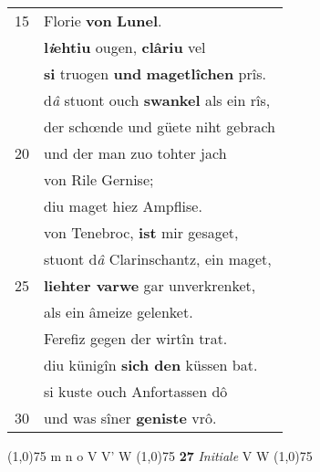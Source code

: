 \documentclass[8pt,a4paper,notitlepage]{article}
\begin{document}
\begin{table}[ht]
\begin{minipage}[t]{0.5\linewidth}
\begin{tabular}{rl}
15 & Florie \textbf{von} \textbf{Lunel}.\\ 
 & \textbf{l\textit{i}ehtiu} ougen, \textbf{clâriu} vel\\ 
 & \textbf{si} truogen \textbf{und} \textbf{magetlîchen} prîs.\\ 
 & d\textit{â} stuont ouch \textbf{swankel} als ein rîs,\\ 
 & der schœnde und güete niht gebrach\\ 
20 & und der man zuo tohter jach\\ 
 & von Rile Gernise;\\ 
 & diu maget hiez Ampflise.\\ 
 & von Tenebroc, \textbf{ist} mir gesaget,\\ 
 & stuont d\textit{â} Clarinschantz, ein maget,\\ 
25 & \textbf{liehter varwe} gar unverkrenket,\\ 
 & als ein âmeize gelenket.\\ 
 & Ferefiz gegen der wirtîn trat.\\ 
 & diu künigîn \textbf{sich den} küssen bat.\\ 
 & si kuste ouch Anfortassen dô\\ 
30 & und was sîner \textbf{geniste} vrô.\\ 
\end{tabular}
\scriptsize
\line(1,0){75} \newline
m n o V V' W \newline
\line(1,0){75} \newline
\textbf{27} \textit{Initiale} V W  \newline
\line(1,0){75} \newline

\end{minipage}
\end{table}
\end{document}
